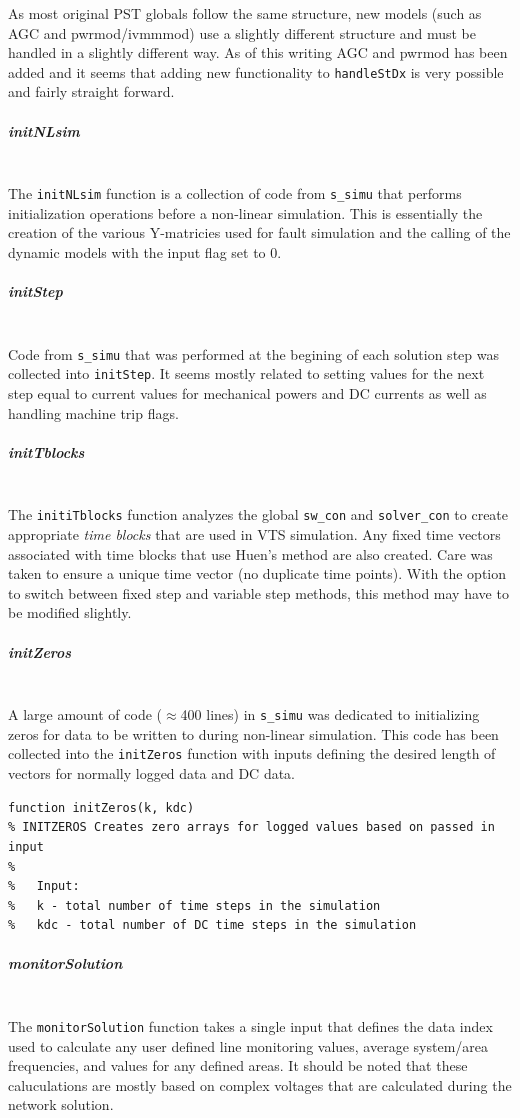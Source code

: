 \documentclass[12pt]{article}
\begin{document}
As most original PST globals follow the same structure, new models (such as AGC and pwrmod/ivmmmod) use a slightly different structure and must be handled in a slightly different way.
As of this writing AGC and pwrmod has been added and it seems that adding new functionality to \verb|handleStDx| is very possible and fairly straight forward.

\subparagraph{initNLsim} \ \\
The \verb|initNLsim| function is a collection of code from \verb|s_simu| that performs initialization operations before a non-linear simulation.
This is essentially the creation of the various Y-matricies used for fault simulation and the calling of the dynamic models with the input flag set to 0.


\subparagraph{initStep} \ \\
Code from \verb|s_simu| that was performed at the begining of each solution step was collected into \verb|initStep|.
It seems mostly related to setting values for the next step equal to current values for mechanical powers and DC currents as well as handling machine trip flags.

\subparagraph{initTblocks} \ \\
The \verb|initiTblocks| function analyzes the global \verb|sw_con| and \verb|solver_con| to create appropriate \emph{time blocks} that are used in VTS simulation.
Any fixed time vectors associated with time blocks that use Huen's method are also created.
Care was taken to ensure a unique time vector (no duplicate time points).
With the option to switch between fixed step and variable step  methods, this method may have to be modified slightly.

\subparagraph{initZeros} \ \\
A large amount of code ($\approx$400 lines) in \verb|s_simu| was dedicated to initializing zeros for data to be written to during non-linear simulation.
This code has been collected into the \verb|initZeros| function with inputs defining the desired length of vectors for normally logged data and DC data.

\begin{verbatim}
function initZeros(k, kdc)
% INITZEROS Creates zero arrays for logged values based on passed in input
%
%   Input:
%   k - total number of time steps in the simulation
%   kdc - total number of DC time steps in the simulation
\end{verbatim}
\subparagraph{monitorSolution} \ \\
The \verb|monitorSolution| function takes a single input that defines the data index used to calculate any user defined line monitoring values, average system/area frequencies, and values for any defined areas.
It should be noted that these caluculations are mostly based on complex voltages that are calculated during the network solution.
\end{document}
